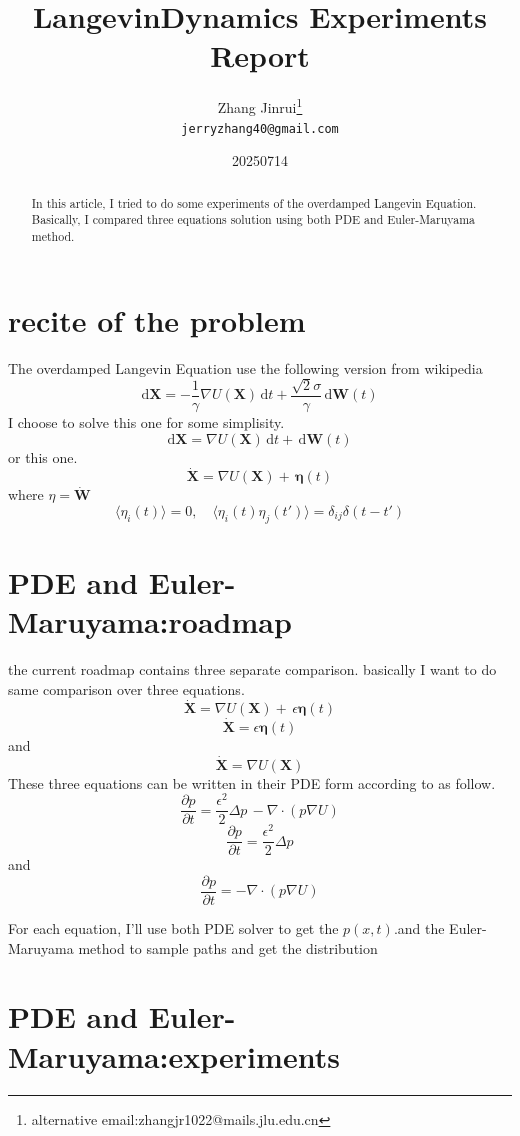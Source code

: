 \documentclass{article}
\title{LangevinDynamics Experiments Report}
\author{Zhang Jinrui\thanks{alternative email:zhangjr1022@mails.jlu.edu.cn} \\ \texttt{jerryzhang40@gmail.com}}
\date{20250714}  %
\theoremstyle{definition} %
\begin{document}
\maketitle

\begin{abstract}
    In this article, I tried to do some experiments
    of the overdamped Langevin Equation.
    Basically, I compared three equations solution
    using both PDE and Euler-Maruyama method.
\end{abstract}

\section{recite of the problem}
The overdamped Langevin Equation use the following
version from wikipedia
\cite[Langevin]{Langevin}
\[
    \mathrm{d}\mathbf{X} = -\frac{1}{\gamma} \nabla U(\mathbf{X}) \,\mathrm{d}t + \frac{\sqrt{2}\sigma}{\gamma} \,\mathrm{d}\mathbf{W}(t)
\]
I choose to solve this one for some simplisity.
\[
    \mathrm{d}\mathbf{X} = \nabla U(\mathbf{X}) \,\mathrm{d}t +  \,\mathrm{d}\mathbf{W}(t)
\]
or this one.
\[
    \dot{\mathbf{X}} =  \nabla U(\mathbf{X}) +  \,\boldsymbol{\eta}(t)
\]
where \(\eta=\dot{\mathbf{W}}\)
\[
    \langle \eta_i(t) \rangle = 0, \quad
    \langle \eta_i(t) \eta_j(t') \rangle = \delta_{ij} \delta(t - t')
\]

\section{PDE and Euler-Maruyama:roadmap}
the current roadmap contains three separate comparison.
basically I want to do same comparison over three
equations.
\[
    \dot{\mathbf{X}} =  \nabla U(\mathbf{X}) +  \,\epsilon\boldsymbol{\eta}(t)
\]
\[
    \dot{\mathbf{X}} =  \epsilon\boldsymbol{\eta}(t)
\]
and
\[
    \dot{\mathbf{X}} =  \nabla U(\mathbf{X})
\]
These three equations can be written in their
PDE form according to
\cite[Fokker-Planck Equation]{Fokker-Planck}
as follow.
\[
    \frac{\partial p}{\partial t} =  \frac{\epsilon^2}{2}  \Delta p\,-\nabla\cdot(p\nabla U)
\]
\[
    \frac{\partial p}{\partial t} = \frac{\epsilon^2}{2}  \Delta p
\]
and
\[
    \frac{\partial p}{\partial t} =  -\nabla\cdot(p\nabla U)
\]

For each equation, I'll use both PDE solver
to get the \(p(x,t)\).and the Euler-Maruyama method
to sample paths and get the distribution

\section{PDE and Euler-Maruyama:experiments}
\end{document}
